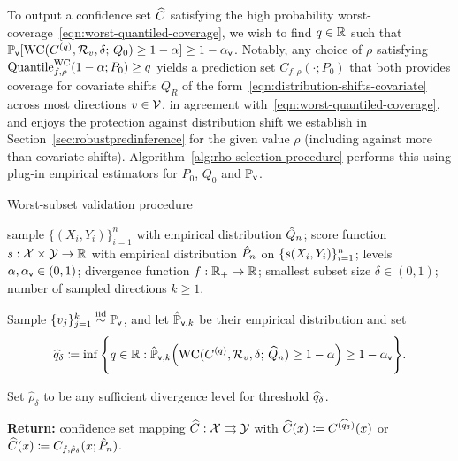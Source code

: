 To output a confidence set $\widehat{C}$ satisfying the high probability
worst-coverage~\eqref{eqn:worst-quantiled-coverage}, we wish to find $q \in
\mathbb{R}$ such that $\mathbb{P}_{\mathsf{v}}[ \textup{WC}(C^{(q)}, \mathcal{R}_v, \delta; \, Q_0) \geq 1 -
  \alpha] \geq 1-\alpha_{\mathsf{v}}$. Notably, any choice of $\rho$ satisfying
$\textup{Quantile}^{\textup{WC}}_{f,\rho}(1 - \alpha; P_0) \ge q$ yields a prediction set
$C_{f,\rho}(\cdot; P_0)$ that both provides coverage for covariate shifts
$Q_R$ of the form~\eqref{eqn:distribution-shifts-covariate} across most
directions $v \in \mathcal{V}$, in agreement
with~\eqref{eqn:worst-quantiled-coverage}, and enjoys the protection against
distribution shift we establish in Section~\ref{sec:robustpredinference} for
the given value $\rho$ (including against more than covariate shifts).
Algorithm~\ref{alg:rho-selection-procedure} performs this using plug-in
empirical estimators for $P_0$, $Q_0$ and $\mathbb{P}_{\mathsf{v}}$.

\begin{algorithm}
  \caption{Worst-subset validation procedure}
  \label{alg:rho-selection-procedure}
  \begin{algorithmic}
     sample $\{(X_i,Y_i) \}_{i=1}^n$ with empirical
    distribution $\hat{Q}_n$; score function $s: \mathcal{X} \times \mathcal{Y}
    \to \mathbb{R}$ with empirical distribution $\hat{P}_n$ on $\{s(X_i,
    Y_i)\}_{i=1}^n$; levels $\alpha, \alpha_{\mathsf{v}} \in (0,1)$; divergence function
    $f : \mathbb{R}_+ \to \mathbb{R}$; smallest subset size $\delta \in (0,1)$;
    number of sampled directions $k \ge 1.$


     Sample $\{ v_j \}_{j=1}^k \stackrel{\rm iid}{\sim} \mathbb{P}_{\mathsf{v}}$, and let
    $\hat{\mathbb{P}}_{\mathsf{v},k}$ be their empirical distribution and set
    \begin{align}
      \label{eqn:rhohat-criterion}
      \widehat{q}_\delta
      \coloneqq \inf \Bigg\{ q \in \mathbb{R} : \hat{\mathbb{P}}_{\mathsf{v},k} \Big( \textup{WC}(C^{(q)}, \mathcal{R}_v, \delta; \, \widehat{Q}_{n}) \geq 1-\alpha \Big) \geq 1-\alpha_{\mathsf{v}} \Bigg\}.
    \end{align}

    \STATE Set $\hat{\rho}_\delta$ to be any sufficient
    divergence level for threshold $\widehat{q}_\delta$.

    \STATE \textbf{Return:}
    confidence set mapping $\widehat{C} : \mathcal{X} \rightrightarrows \mathcal{Y}$ with
    $\widehat{C}(x)  \coloneqq C^{(\widehat{q}_\delta ) }(x)$ or
    $\widehat{C}(x) \coloneqq C_{f,\hat \rho_\delta}(x; \hat{P}_n)$.
  \end{algorithmic}
\end{algorithm}

